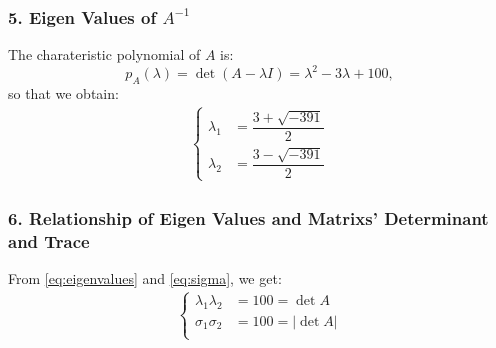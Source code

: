 \subsubsection*{5. Eigen Values of $A^{-1}$}
The charateristic polynomial of $A$ is:
\begin{equation*}
    p_A(\lambda) = \det(A-\lambda I) = \lambda^2 - 3\lambda + 100,
\end{equation*}
so that we obtain:
\begin{align}
    \label{eq:eigenvalues}
    \left
    \{ \begin{aligned}
        \lambda_1 &= \dfrac{3+\sqrt{-391}}{2} \\ \lambda_2 &= \dfrac{3-\sqrt{-391}}{2}
    \end{aligned}
    \right.
\end{align}

\subsubsection*{6. Relationship of Eigen Values and Matrixs' Determinant and Trace}
From \eqref{eq:eigenvalues} and \eqref{eq:sigma}, we get:
\begin{align*}
    \left
    \{ \begin{aligned}
        \lambda_1\lambda_2 &= 100 = \det A \\ 
        \sigma_1\sigma_2   &= 100 = |\det A|\\
    \end{aligned}
    \right.
\end{align*}




